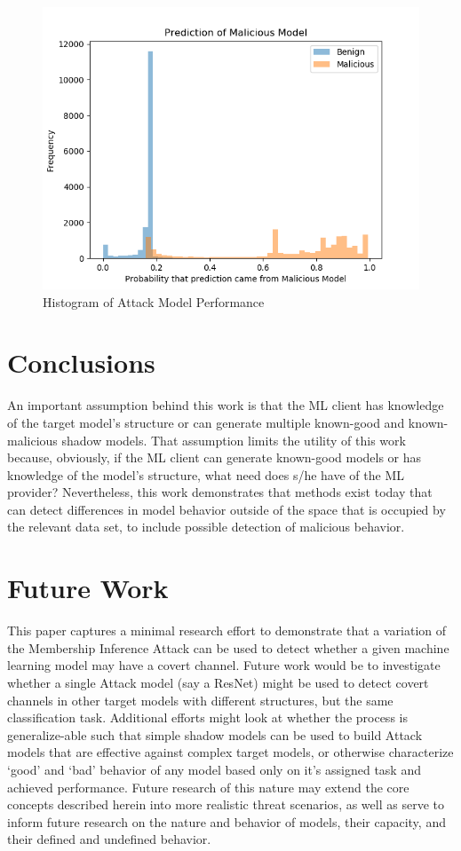 \begin{figure}[H]
    \centering
    \includegraphics[scale=0.4]{graphics/results_200e.png}
    \caption{Histogram of Attack Model Performance}
    \label{fig:results_hist}
\end{figure}



\section{Conclusions}

An important assumption behind this work is that the ML client has knowledge of the target model's structure or can generate multiple known-good and known-malicious shadow models.  That assumption limits the utility of this work because, obviously, if the ML client can generate known-good models or has knowledge of the model's structure, what need does s/he have of the ML provider?  Nevertheless, this work demonstrates that methods exist today that can detect differences in model behavior outside of the space that is occupied by the relevant data set, to include possible detection of malicious behavior.

\section{Future Work}

This paper captures a minimal research effort to demonstrate that a variation of the Membership Inference Attack can be used to detect whether a given machine learning model may have a covert channel. Future work would be to investigate whether a single Attack model (say a ResNet) might be used to detect covert channels in other target models with different structures, but the same classification task.  Additional efforts might look at whether the process is generalize-able such that simple shadow models can be used to build Attack models that are effective against complex target models, or otherwise characterize `good' and `bad' behavior of any model based only on it's assigned task and achieved performance.  Future research of this nature may extend the core concepts described herein into more realistic threat scenarios, as well as serve to inform future research on the nature and behavior of models, their capacity, and their defined and undefined behavior.


